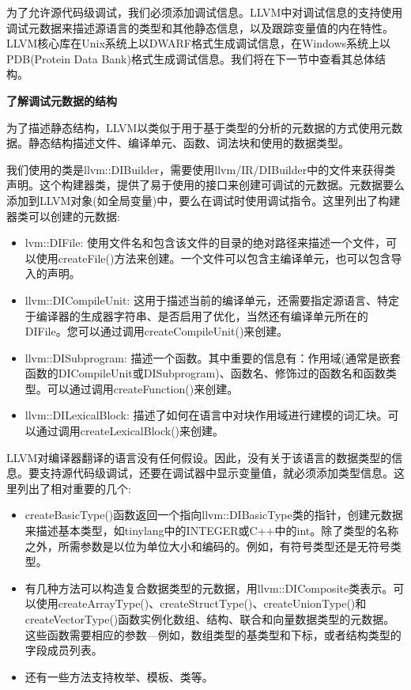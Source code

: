 
为了允许源代码级调试，我们必须添加调试信息。LLVM中对调试信息的支持使用调试元数据来描述源语言的类型和其他静态信息，以及跟踪变量值的内在特性。LLVM核心库在Unix系统上以DWARF格式生成调试信息，在Windows系统上以PDB(Protein Data Bank)格式生成调试信息。我们将在下一节中查看其总体结构。\par

\hspace*{\fill} \par %
\textbf{了解调试元数据的结构}

为了描述静态结构，LLVM以类似于用于基于类型的分析的元数据的方式使用元数据。静态结构描述文件、编译单元、函数、词法块和使用的数据类型。\par

我们使用的类是llvm::DIBuilder，需要使用llvm/IR/DIBuilder中的文件来获得类声明。这个构建器类，提供了易于使用的接口来创建可调试的元数据。元数据要么添加到LLVM对象(如全局变量)中，要么在调试时使用调试指令。这里列出了构建器类可以创建的元数据:\par

\begin{itemize}
\item lvm::DIFile: 使用文件名和包含该文件的目录的绝对路径来描述一个文件，可以使用createFile()方法来创建。一个文件可以包含主编译单元，也可以包含导入的声明。

\item llvm::DICompileUnit: 这用于描述当前的编译单元，还需要指定源语言、特定于编译器的生成器字符串、是否启用了优化，当然还有编译单元所在的DIFile。您可以通过调用createCompile\allowbreak Unit()来创建。

\item llvm::DISubprogram: 描述一个函数。其中重要的信息有：作用域(通常是嵌套函数的DIComp\allowbreak ileUnit或DISubprogram)、函数名、修饰过的函数名和函数类型。可以通过调用createFunction()来创建。

\item llvm::DILexicalBlock: 描述了如何在语言中对块作用域进行建模的词汇块。可以通过调用createLexicalBlock()来创建。

\end{itemize}

LLVM对编译器翻译的语言没有任何假设。因此，没有关于该语言的数据类型的信息。要支持源代码级调试，还要在调试器中显示变量值，就必须添加类型信息。这里列出了相对重要的几个:\par

\begin{itemize}
\item createBasicType()函数返回一个指向llvm::DIBasicType类的指针，创建元数据来描述基本类型，如tinylang中的INTEGER或C++中的int。除了类型的名称之外，所需参数是以位为单位大小和编码的。例如，有符号类型还是无符号类型。

\item 有几种方法可以构造复合数据类型的元数据，用llvm::DIComposite类表示。可以使用create\allowbreak ArrayType()、createStructType()、createUnionType()和createVectorType()函数实例化数组、结构、联合和向量数据类型的元数据。这些函数需要相应的参数—例如，数组类型的基类型和下标，或者结构类型的字段成员列表。

\item 还有一些方法支持枚举、模板、类等。
\end{itemize}

